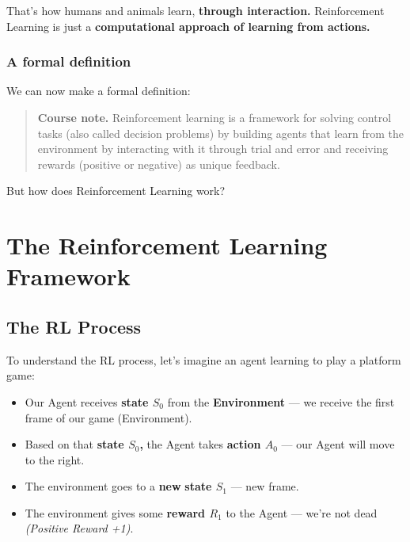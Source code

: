 \documentclass[11pt,a4paper]{article}
\begin{document}
That's how humans and animals learn, \textbf{through interaction.} Reinforcement Learning is just a \textbf{computational approach of learning from actions.}

\subsubsection{A formal definition}\label{a-formal-definition}

We can now make a formal definition:

\begin{quote}
\textbf{Course note.} Reinforcement learning is a framework for solving control tasks (also called decision problems) by building agents that learn from the environment by interacting with it through trial and error and receiving rewards (positive or negative) as unique feedback.
\end{quote}

But how does Reinforcement Learning work?

\section{The Reinforcement Learning Framework}\label{the-reinforcement-learning-framework}

\subsection{The RL Process}\label{the-rl-process}



To understand the RL process, let's imagine an agent learning to play a platform game:


\begin{itemize}
\tightlist
\item
  Our Agent receives \textbf{state \(S_0\)} from the \textbf{Environment} --- we receive the first frame of our game (Environment).
\item
  Based on that \textbf{state \(S_0\),} the Agent takes \textbf{action \(A_0\)} --- our Agent will move to the right.
\item
  The environment goes to a \textbf{new} \textbf{state \(S_1\)} --- new frame.
\item
  The environment gives some \textbf{reward \(R_1\)} to the Agent --- we're not dead \emph{(Positive Reward +1)}.
\end{itemize}
\end{document}
